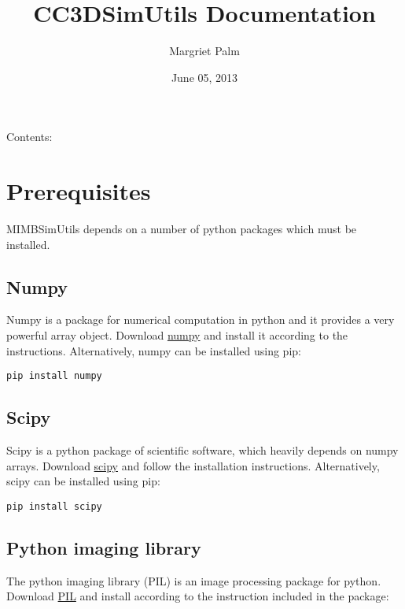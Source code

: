 \documentclass[letterpaper,10pt,english]{sphinxmanual}
\title{CC3DSimUtils Documentation}
\date{June 05, 2013}
\author{Margriet Palm}
\begin{document}
\maketitle
\tableofcontents
{}\label{CC3DSimUtils::doc}


Contents:


\chapter{Prerequisites}
\label{Preq:prerequisites}\label{Preq::doc}\label{Preq:welcome-to-cc3dsimutils-documentation}
MIMBSimUtils depends on a number of python packages which must be installed.


\section{Numpy}
\label{Preq:numpy}
Numpy is a package for numerical computation in python and it provides a very powerful array object. Download \href{http://sourceforge.net/projects/numpy/files/}{numpy} and install it according to the instructions. Alternatively, numpy can be installed using pip:

\begin{Verbatim}[commandchars=\\\{\}]
pip install numpy
\end{Verbatim}


\section{Scipy}
\label{Preq:scipy}
Scipy is a python package of scientific software, which heavily depends on numpy arrays. Download \href{http://sourceforge.net/projects/scipy/files/}{scipy} and follow the installation instructions. Alternatively, scipy can be installed using pip:

\begin{Verbatim}[commandchars=\\\{\}]
pip install scipy
\end{Verbatim}


\section{Python imaging library}
\label{Preq:python-imaging-library}
The python imaging library (PIL) is an image processing package for python. Download \href{http://www.pythonware.com/products/pil/\#pil117}{PIL} and install according to the instruction included in the package:
\end{document}
